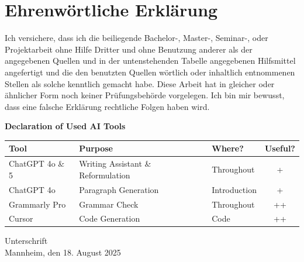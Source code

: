 \documentclass[a4paper,oneside,bibliography=totoc]{scrbook}
\begin{document}
\backmatter
\chapter{Ehrenwörtliche Erklärung}
\label{ch:declaration}

Ich versichere, dass ich die beiliegende Bachelor-, Master-, Seminar-, oder
Projektarbeit ohne Hilfe Dritter und ohne Benutzung anderer als der angegebenen
Quellen und in der untenstehenden Tabelle angegebenen Hilfsmittel angefertigt
und die den benutzten Quellen wörtlich oder inhaltlich entnommenen Stellen als
solche kenntlich gemacht habe. Diese Arbeit hat in gleicher oder ähnlicher Form
noch keiner Prüfungsbehörde vorgelegen. Ich bin mir bewusst, dass eine falsche
Erklärung rechtliche Folgen haben wird.

\begin{center}
  \textbf{Declaration of Used AI Tools} \\[.3em]
  \begin{tabularx}{\textwidth}{lXlc}
    \toprule
    Tool            & Purpose                            & Where?       & Useful? \\
    \midrule
    ChatGPT 4o \& 5 & Writing Assistant \& Reformulation & Throughout   & +       \\
    ChatGPT 4o      & Paragraph Generation               & Introduction & +       \\
    Grammarly Pro   & Grammar Check                      & Throughout   & ++      \\
    Cursor          & Code Generation                    & Code         & ++      \\
    \bottomrule
  \end{tabularx}
\end{center}

\vspace{2cm}
\noindent Unterschrift\\
\noindent Mannheim, den 18. August 2025 \hfill
\end{document}
